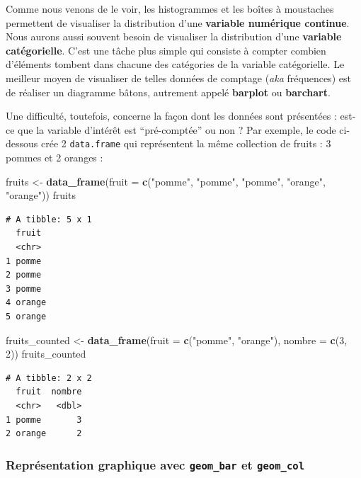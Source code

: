 \documentclass[a4paperpaper,]{article}
\newenvironment{Shaded}{\begin{snugshade}}{\end{snugshade}}
\newcommand{\DataTypeTok}[1]{\textcolor[rgb]{0.00,0.34,0.68}{#1}}
\newcommand{\DecValTok}[1]{\textcolor[rgb]{0.69,0.50,0.00}{#1}}
\newcommand{\KeywordTok}[1]{\textcolor[rgb]{0.12,0.11,0.11}{\textbf{#1}}}
\newcommand{\NormalTok}[1]{\textcolor[rgb]{0.12,0.11,0.11}{#1}}
\newcommand{\StringTok}[1]{\textcolor[rgb]{0.75,0.01,0.01}{#1}}
\begin{document}
Comme nous venons de le voir, les histogrammes et les boîtes à moustaches permettent de visualiser la distribution d'une \textbf{variable numérique continue}. Nous aurons aussi souvent besoin de visualiser la distribution d'une \textbf{variable catégorielle}. C'est une tâche plus simple qui consiste à compter combien d'éléments tombent dans chacune des catégories de la variable catégorielle. Le meilleur moyen de visualiser de telles données de comptage (\emph{aka} fréquences) est de réaliser un diagramme bâtons, autrement appelé \textbf{barplot} ou \textbf{barchart}.

Une difficulté, toutefois, concerne la façon dont les données sont présentées : est-ce que la variable d'intérêt est ``pré-comptée'' ou non ? Par exemple, le code ci-dessous crée 2 \texttt{data.frame} qui représentent la même collection de fruits : 3 pommes et 2 oranges :

\begin{Shaded}
\begin{Highlighting}[]
\NormalTok{fruits <-}\StringTok{ }\KeywordTok{data_frame}\NormalTok{(}\DataTypeTok{fruit =} \KeywordTok{c}\NormalTok{(}\StringTok{"pomme"}\NormalTok{, }\StringTok{"pomme"}\NormalTok{, }\StringTok{"pomme"}\NormalTok{, }\StringTok{"orange"}\NormalTok{, }\StringTok{"orange"}\NormalTok{))}
\NormalTok{fruits}
\end{Highlighting}
\end{Shaded}

\begin{verbatim}
# A tibble: 5 x 1
  fruit 
  <chr> 
1 pomme 
2 pomme 
3 pomme 
4 orange
5 orange
\end{verbatim}

\begin{Shaded}
\begin{Highlighting}[]
\NormalTok{fruits_counted <-}\StringTok{ }\KeywordTok{data_frame}\NormalTok{(}\DataTypeTok{fruit =} \KeywordTok{c}\NormalTok{(}\StringTok{"pomme"}\NormalTok{, }\StringTok{"orange"}\NormalTok{), }\DataTypeTok{nombre =} \KeywordTok{c}\NormalTok{(}\DecValTok{3}\NormalTok{, }
    \DecValTok{2}\NormalTok{))}
\NormalTok{fruits_counted}
\end{Highlighting}
\end{Shaded}

\begin{verbatim}
# A tibble: 2 x 2
  fruit  nombre
  <chr>   <dbl>
1 pomme       3
2 orange      2
\end{verbatim}

\hypertarget{representation-graphique-avec-geom_bar-et-geom_col}{%
\subsubsection{\texorpdfstring{Représentation graphique avec \texttt{geom\_bar} et \texttt{geom\_col}}{Représentation graphique avec geom\_bar et geom\_col}}\label{representation-graphique-avec-geom_bar-et-geom_col}}
\end{document}
